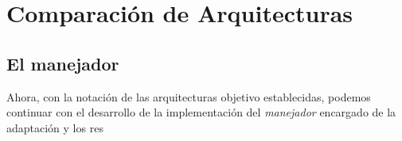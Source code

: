 \chapter{Comparación de Arquitecturas}

\section{El manejador}

Ahora, con la notación de las arquitecturas objetivo establecidas, podemos continuar con el desarrollo de la implementación del \textit{manejador} encargado de la adaptación y los res